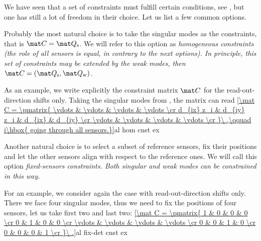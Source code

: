 We have seen that a set of constraints must fulfill certain conditions, see , but one has still a lot of freedom in their choice. Let us list a few common options.

\> Probably the most natural choice is to take the singular modes as the constraints, that is $\mat C = \mat Q_{\rm s}$. We will refer to this option as \em{homogeneous constraints} (the role of all sensors is equal, in contrary to the next options). In principle, this set of constraints may be extended by the weak modes, then $\mat C = (\mat Q_{\rm s}, \mat Q_{\rm w})$.
\par\parindent\itindent\indent\hang As an example, we write explicitly the constraint matrix $\mat C$ for the read-out-direction shifts only. Taking the singular modes from , the matrix can read
\eqref{\mat C = \pmatrix{
	\vdots		& \vdots		& \vdots	& \vdots \cr
	d_{ix} z_i	& d_{iy} z_i	& d_{ix}	& d_{iy} \cr
	\vdots		& \vdots		& \vdots	& \vdots \cr
}\ ,\qquad i\hbox{ going through all sensors.}}{al hom cnst ex}

\> Another natural choice is to select a subset of reference sensors, fix their positions and let the other sensors align with respect to the reference ones. We will call this option \em{fixed-sensors constraints}. Both singular and weak modes can be constrained in this way.
\par\parindent\itindent\indent\hang For an example, we consider again the case with read-out-direction shifts only. There we face four singular modes, thus we need to fix the positions of four sensors, let us take first two and last two:
\eqref{\mat C = \pmatrix{
	1		& 0			& 0 		& 0 		\cr
	0		& 1			& 0 		& 0 		\cr
	\vdots	& \vdots	& \vdots	& \vdots	\cr
	0		& 0			& 1 		& 0 		\cr
	0		& 0			& 0 		& 1 		\cr
}\ .}{al fix-det cnst ex}

